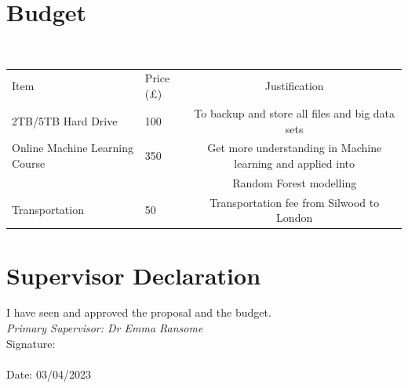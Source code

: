 \documentclass[a4paper]{report}
\begin{document}
\section{Budget}\\
\begin{table}[H]
\begin{tabular}{llc}
Item               & Price (£) & Justification                                   \\
2TB/5TB Hard Drive & 100       & To backup and store all files and big data sets \\
Online Machine Learning Course & 350 & Get more understanding in Machine learning and applied into \\ & &Random Forest modelling \\
Transportation     & 50        & Transportation fee from Silwood to London      
\end{tabular}
\end{table}

\section{Supervisor Declaration}

I have seen and approved the proposal and the budget. \\
\textit{Primary Supervisor: Dr Emma Ransome}\\
Signature:\\
\\
Date: 03/04/2023


   
\end{document}
